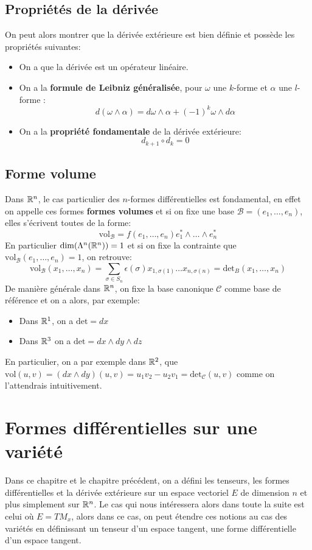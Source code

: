    \section{Propriétés de la dérivée}
   On peut alors montrer que la dérivée extérieure est bien définie et possède les propriétés suivantes:
   \begin{itemize}
      \item On a que la dérivée est un opérateur linéaire.
      \item On a la \textbf{formule de Leibniz généralisée}, pour \(\omega\) une \(k\)-forme et \(\alpha\) une \(l\)-forme : \[d(\omega \wedge \alpha) = d\omega \wedge \alpha + (-1)^k\omega \wedge d\alpha\]
      \item On a la \textbf{propriété fondamentale} de la dérivée extérieure:
      \[ 
         d_{k+1} \circ d_k = 0 
      \]
   \end{itemize}
   \section{Forme volume}
   Dans \(\mathbb{R}^n\), le cas particulier des \(n\)-formes différentielles est fondamental, en effet on appelle ces formes \textbf{formes volumes} et si on fixe une base \( \mathcal{B} = (e_1, \ldots, e_n) \), elles s'écrivent toutes de la forme:
   \[
      \text{vol}_\mathcal{B} = f(e_1, \ldots, e_n)e_1^* \wedge \ldots \wedge e_n^*
   \]
   En particulier \( \dim(\Lambda^n( \mathbb{R}^n)) = 1\) et si on fixe la contrainte que \( \text{vol}_\mathcal{B}(e_1, \ldots, e_n) = 1 \), on retrouve:
   \[ 
      \text{vol}_\mathcal{B}(x_1, \ldots, x_n) = \sum_{\sigma \in S_n} \epsilon(\sigma) x_{1, \sigma(1)} \ldots x_{n, \sigma(n)} = \text{det}_B(x_1, \ldots, x_n)
   \]
   De manière générale dans \( \mathbb{R}^n \), on fixe la base canonique \( \mathcal{C} \) comme base de référence et on a alors, par exemple:
   \begin{itemize}
      \item Dans \(\mathbb{R}^1\), on a \(\text{det} = dx\)
      \item Dans \(\mathbb{R}^3\) on a \(\text{det} = dx \wedge dy \wedge dz\)
   \end{itemize}
   En particulier, on a par exemple dans \(\mathbb{R}^2\), que \(\text{vol}(u, v) = (dx \wedge dy)(u, v) = u_1v_2 - u_2v_1 = \text{det}_\mathcal{C}(u, v)\) comme on l'attendrais intuitivement.

\chapter{Formes différentielles sur une variété}
   Dans ce chapitre et le chapitre précédent, on a défini les tenseurs, les formes différentielles et la dérivée extérieure sur un espace vectoriel \( E \) de dimension \( n \) et plus simplement sur \( \mathbb{R}^n \). Le cas qui nous intéressera alors dans toute la suite est celui où \( E = TM_x \), alors dans ce cas, on peut étendre ces notions au cas des variétés en définissant un tenseur d'un espace tangent, une forme différentielle d'un espace tangent.\< 
   
